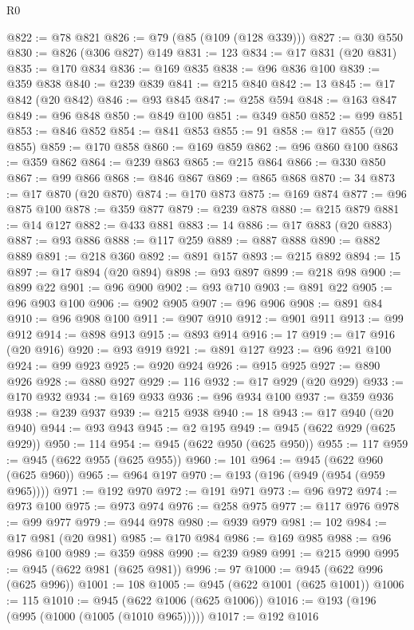 \begin{lexlean}{R0}
\begin{coremodule}
@822 := @78 @821
@826 := @79 (@85 (@109 (@128 @339)))
@827 := @30 @550
@830 := @826 (@306 @827) @149
@831 := 123
@834 := @17 @831 (@20 @831)
@835 := @170 @834
@836 := @169 @835
@838 := @96 @836 @100
@839 := @359 @838
@840 := @239 @839
@841 := @215 @840
@842 := 13
@845 := @17 @842 (@20 @842)
@846 := @93 @845
@847 := @258 @594
@848 := @163 @847
@849 := @96 @848
@850 := @849 @100
@851 := @349 @850
@852 := @99 @851
@853 := @846 @852
@854 := @841 @853
@855 := 91
@858 := @17 @855 (@20 @855)
@859 := @170 @858
@860 := @169 @859
@862 := @96 @860 @100
@863 := @359 @862
@864 := @239 @863
@865 := @215 @864
@866 := @330 @850
@867 := @99 @866
@868 := @846 @867
@869 := @865 @868
@870 := 34
@873 := @17 @870 (@20 @870)
@874 := @170 @873
@875 := @169 @874
@877 := @96 @875 @100
@878 := @359 @877
@879 := @239 @878
@880 := @215 @879
@881 := @14 @127
@882 := @433 @881
@883 := 14
@886 := @17 @883 (@20 @883)
@887 := @93 @886
@888 := @117 @259
@889 := @887 @888
@890 := @882 @889
@891 := @218 @360
@892 := @891 @157
@893 := @215 @892
@894 := 15
@897 := @17 @894 (@20 @894)
@898 := @93 @897
@899 := @218 @98
@900 := @899 @22
@901 := @96 @900
@902 := @93 @710
@903 := @891 @22
@905 := @96 @903 @100
@906 := @902 @905
@907 := @96 @906
@908 := @891 @84
@910 := @96 @908 @100
@911 := @907 @910
@912 := @901 @911
@913 := @99 @912
@914 := @898 @913
@915 := @893 @914
@916 := 17
@919 := @17 @916 (@20 @916)
@920 := @93 @919
@921 := @891 @127
@923 := @96 @921 @100
@924 := @99 @923
@925 := @920 @924
@926 := @915 @925
@927 := @890 @926
@928 := @880 @927
@929 := 116
@932 := @17 @929 (@20 @929)
@933 := @170 @932
@934 := @169 @933
@936 := @96 @934 @100
@937 := @359 @936
@938 := @239 @937
@939 := @215 @938
@940 := 18
@943 := @17 @940 (@20 @940)
@944 := @93 @943
@945 := @2 @195
@949 := @945 (@622 @929 (@625 @929))
@950 := 114
@954 := @945 (@622 @950 (@625 @950))
@955 := 117
@959 := @945 (@622 @955 (@625 @955))
@960 := 101
@964 := @945 (@622 @960 (@625 @960))
@965 := @964 @197
@970 := @193 (@196 (@949 (@954 (@959 @965))))
@971 := @192 @970
@972 := @191 @971
@973 := @96 @972
@974 := @973 @100
@975 := @973 @974
@976 := @258 @975
@977 := @117 @976
@978 := @99 @977
@979 := @944 @978
@980 := @939 @979
@981 := 102
@984 := @17 @981 (@20 @981)
@985 := @170 @984
@986 := @169 @985
@988 := @96 @986 @100
@989 := @359 @988
@990 := @239 @989
@991 := @215 @990
@995 := @945 (@622 @981 (@625 @981))
@996 := 97
@1000 := @945 (@622 @996 (@625 @996))
@1001 := 108
@1005 := @945 (@622 @1001 (@625 @1001))
@1006 := 115
@1010 := @945 (@622 @1006 (@625 @1006))
@1016 := @193 (@196 (@995 (@1000 (@1005 (@1010 @965)))))
@1017 := @192 @1016

\end{coremodule}
\end{lexlean}
